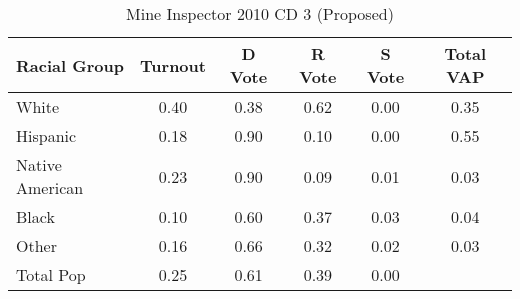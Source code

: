 \begin{table}[htb]
\begin{center}
\caption{Mine Inspector 2010 CD 3 (Proposed)}
\label{smine_vap_cd_3}
\begin{tabular}{lccccc}
  \hline
Racial Group & Turnout & D Vote & R Vote & S Vote & Total VAP \\ 
  \hline
White & 0.40 & 0.38 & 0.62 & 0.00 & 0.35 \\ 
  Hispanic & 0.18 & 0.90 & 0.10 & 0.00 & 0.55 \\ 
  Native American & 0.23 & 0.90 & 0.09 & 0.01 & 0.03 \\ 
  Black & 0.10 & 0.60 & 0.37 & 0.03 & 0.04 \\ 
  Other & 0.16 & 0.66 & 0.32 & 0.02 & 0.03 \\ 
  Total Pop & 0.25 & 0.61 & 0.39 & 0.00 &  \\ 
   \hline
\end{tabular}
\end{center}
\end{table}
